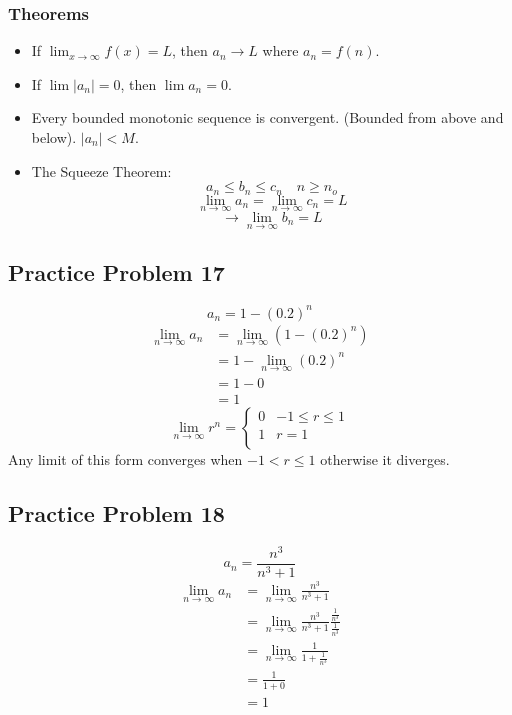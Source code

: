 \documentclass[letterpaper, 12pt]{math}
\begin{document}
\subsubsection*{Theorems}
\begin{itemize}
  \item If \( \lim_{x \to \infty}{f(x)} = L \), then \( a_{n} \rightarrow L \)
    where \( a_{n} = f(n) \).
  \item If \( \lim{|a_{n}|} = 0\), then \( \lim{a_{n}} = 0 \).
  \item Every bounded monotonic sequence is convergent. (Bounded from above and
    below). \( |a_{n}| < M \).
  \item The Squeeze Theorem:
    \[ a_{n} \leq b_{n} \leq c_{n} \quad n \geq n_{o} \]
    \[ \lim_{n\to\infty}{a_{n}} = \lim_{n\to\infty}{c_{n}} = L \]
    \[ \rightarrow \lim_{n\to\infty}{b_{n}} = L \]
\end{itemize}

\subsection*{Practice Problem 17}
\[ a_{n} = 1-(0.2)^{n} \]
\begin{align*}
  \lim_{n\to\infty}{a_{n}} &= \lim_{n\to\infty}{(1-(0.2)^{n})} \\
  &= 1-\lim_{n\to\infty}{(0.2)^{n}} \\
  &= 1-0 \\
  &= 1
\end{align*}
\[
  \lim_{n\to\infty}{r^{n}} =
  \begin{cases}
      0 & -1 \leq r \leq 1 \\
      1 & r = 1 \\
   \end{cases}
\]
Any limit of this form converges when \( -1 < r \leq 1 \) otherwise it
diverges.

\subsection*{Practice Problem 18}
\[ a_{n} = \frac{n^{3}}{n^{3}+1} \]
\begin{align*}
  \lim_{n\to\infty}{a_{n}} &= \lim_{n\to\infty}{\frac{n^{3}}{n^{3}+1}} \\
  &= \lim_{n\to\infty}
    {\frac{n^{3}}{n^{3}+1}\frac{\frac{1}{n^{3}}}{\frac{1}{n^{3}}}} \\
  &= \lim_{n\to\infty}{\frac{1}{1+\frac{1}{n^{3}}}} \\
  &= \frac{1}{1+0} \\
  &= 1
\end{align*}
\end{document}
